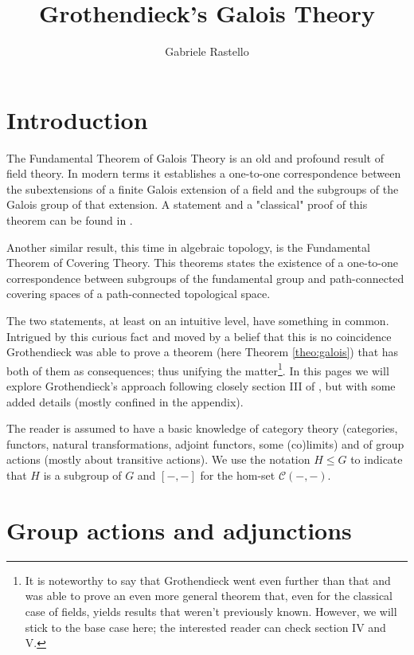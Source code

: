 \documentclass[italian, 12pt, reqno]{article}
\theoremstyle{myteo}
\numberwithin{equation}{section}
\newcommand{\cat}[1]{\mathscr{#1}}
\begin{document}
\title{Grothendieck's Galois Theory}
\author{Gabriele Rastello}
\maketitle

\tableofcontents

\section{Introduction}
\label{sec:introduction}
The Fundamental Theorem of Galois Theory is an old and profound result of field theory.
In modern terms it establishes a one-to-one correspondence between the subextensions of a finite Galois extension of a field and the subgroups of the Galois group of that extension.
A statement and a "classical" proof of this theorem can be found in \cite{lang}.

Another similar result, this time in algebraic topology, is the Fundamental Theorem of Covering Theory.
This theorems states the existence of a one-to-one correspondence between subgroups of the fundamental group and path-connected covering spaces of a path-connected topological space.

The two statements, at least on an intuitive level, have something in common.
Intrigued by this curious fact and moved by a belief that this is no coincidence Grothen\-dieck was able to prove a theorem (here Theorem \ref{theo:galois}) that has both of them as consequences; thus unifying the matter\footnote{It is noteworthy to say that Grothendieck went even further than that and was able to prove an even more general theorem that, even for the classical case of fields, yields results that weren't previously known. However, we will stick to the base case here; the interested reader can check \cite{edo} section IV and V.}.
In this pages we will explore Grothendieck's approach following closely section III of \cite{edo}, but with some added details (mostly confined in the appendix).

The reader is assumed to have a basic knowledge of category theory (categories, functors, natural transformations, adjoint functors, some (co)limits) and of group actions (mostly about transitive actions).
We use the notation \(H\leq G\) to indicate that \(H\) is a subgroup of \(G\) and \([-,-]\) for the hom-set \(\cat{C}(-, -)\).

\section{Group actions and adjunctions}
\label{sec:1}
\end{document}
